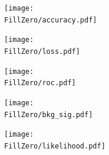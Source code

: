 \documentclass[../../main/main.tex]{subfiles}
\begin{document}
\begin{figure}[H]
  \centering
  \begin{subfigure}[t]{0.5\textwidth}
    \centering
    \texttt{[image: \\FillZero/accuracy.pdf]}
    \caption{\captionAcc}
    \label{fig:FillZero_acc}
  \end{subfigure}
  \vspace{0.01cm}
  \begin{subfigure}[t]{0.5\textwidth}
    \centering
    \texttt{[image: \\FillZero/loss.pdf]}
    \caption{\captionLoss}
    \label{fig:FillZero_loss}
  \end{subfigure}
  \begin{subfigure}[t]{0.5\textwidth}
    \centering
    \texttt{[image: \\FillZero/roc.pdf]}
    \caption{\captionROC}
    \label{fig:FillZero_roc}
  \end{subfigure}
  \caption{}
  \label{fig:FillZero_1}  
\end{figure}

\begin{figure}[H]
  \centering
  \begin{subfigure}[t]{0.5\textwidth}
    \centering
    \texttt{[image: \\FillZero/bkg\_sig.pdf]}
    \caption{\captionBkgSig}    
    \label{fig:FillZero_bkg_sig}
  \end{subfigure}
  \vspace{0.01cm}
  \begin{subfigure}[t]{0.5\textwidth}
    \centering
    \texttt{[image: \\FillZero/likelihood.pdf]}
    \caption{\captionLik}    
    \label{fig:FillZero_likelihood}
  \end{subfigure}
  \caption{}
  \label{fig:FillZero_Z}
\end{figure}
\end{document}

